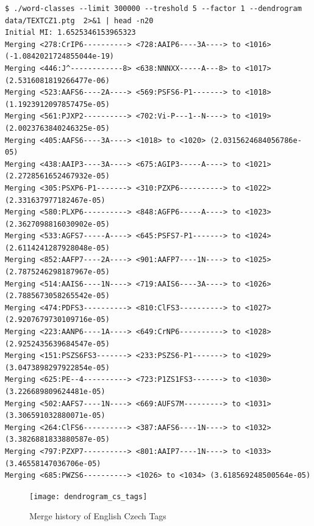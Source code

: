 \documentclass[12pt,a4paper]{article}
\begin{document}
\begin{verbatim}
$ ./word-classes --limit 300000 --treshold 5 --factor 1 --dendrogram data/TEXTCZ1.ptg  2>&1 | head -n20
Initial MI: 1.6525346153965323
Merging <278:CrIP6----------> <728:AAIP6----3A----> to <1016> (-1.0842021724855044e-19)
Merging <446:J^------------8> <638:NNNXX-----A---8> to <1017> (2.5316081819266477e-06)
Merging <523:AAFS6----2A----> <569:PSFS6-P1-------> to <1018> (1.1923912097857475e-05)
Merging <561:PJXP2----------> <702:Vi-P---1--N----> to <1019> (2.0023763840246325e-05)
Merging <405:AAFS6----3A----> <1018> to <1020> (2.0315624684056786e-05)
Merging <438:AAIP3----3A----> <675:AGIP3-----A----> to <1021> (2.2728561652467932e-05)
Merging <305:PSXP6-P1-------> <310:PZXP6----------> to <1022> (2.331637977182467e-05)
Merging <580:PLXP6----------> <848:AGFP6-----A----> to <1023> (2.3627098816030902e-05)
Merging <533:AGFS7-----A----> <645:PSFS7-P1-------> to <1024> (2.6114241287928048e-05)
Merging <852:AAFP7----2A----> <901:AAFP7----1N----> to <1025> (2.7875246298187967e-05)
Merging <514:AAIS6----1N----> <719:AAIS6----3A----> to <1026> (2.7885673058265542e-05)
Merging <474:PDFS3----------> <810:ClFS3----------> to <1027> (2.9207679730109716e-05)
Merging <223:AANP6----1A----> <649:CrNP6----------> to <1028> (2.9252435639684547e-05)
Merging <151:PSZS6FS3-------> <233:PSZS6-P1-------> to <1029> (3.0473898297922854e-05)
Merging <625:PE--4----------> <723:P1ZS1FS3-------> to <1030> (3.226689809624481e-05)
Merging <502:AAFS7----1N----> <669:AUFS7M---------> to <1031> (3.306591032880071e-05)
Merging <264:ClFS6----------> <387:AAFS6----1N----> to <1032> (3.3826881833880587e-05)
Merging <797:PZXP7----------> <801:AAIP7----1N----> to <1033> (3.46558147036706e-05)
Merging <685:PWZS6----------> <1026> to <1034> (3.618569248500564e-05)
\end{verbatim}

\begin{figure}[h!]
  \centering
  \texttt{[image: dendrogram\_cs\_tags]}
  \caption{Merge history of English Czech Tags}
  \label{dendrogram_cs_tags}
\end{figure}
\end{document}
